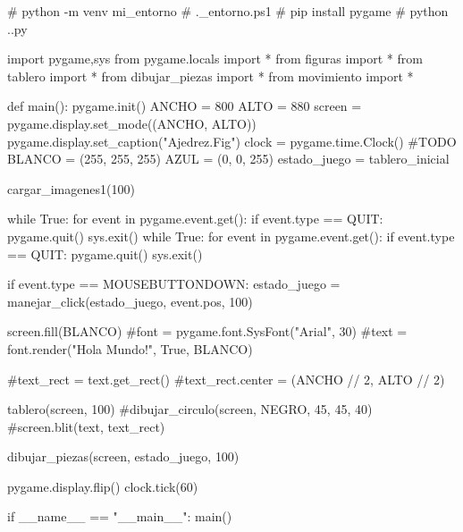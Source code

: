 
# python -m venv mi_entorno
# .\mi_entorno\Scripts\Activate.ps1
# pip install pygame
# python .\trabajo.py

import pygame,sys
from pygame.locals import *
from figuras import *
from tablero import *
from dibujar_piezas import *
from movimiento import *


def main():
    pygame.init()
    ANCHO = 800
    ALTO = 880
    screen = pygame.display.set_mode((ANCHO, ALTO))
    pygame.display.set_caption("Ajedrez.Fig")
    clock = pygame.time.Clock()
    #TODO
    BLANCO = (255, 255, 255)
    AZUL = (0, 0, 255)
    estado_juego = tablero_inicial

    cargar_imagenes1(100)
    
    while True:
        for event in pygame.event.get():
            if event.type == QUIT:
                pygame.quit()
                sys.exit()
                while True:
                  for event in pygame.event.get():
                   if event.type == QUIT:
                    pygame.quit()
                sys.exit()

            if event.type == MOUSEBUTTONDOWN:                   
                estado_juego = manejar_click(estado_juego, event.pos, 100)

            
            screen.fill(BLANCO)
            #font = pygame.font.SysFont("Arial", 30)
            #text = font.render("Hola Mundo!", True, BLANCO)

            #text_rect = text.get_rect()
            #text_rect.center =  (ANCHO // 2, ALTO // 2)
            
            tablero(screen, 100)
            #dibujar_circulo(screen, NEGRO, 45, 45, 40)
            #screen.blit(text, text_rect)

            dibujar_piezas(screen, estado_juego, 100)

            pygame.display.flip()
            clock.tick(60)
    
if __name__ == "__main__":
    main()

